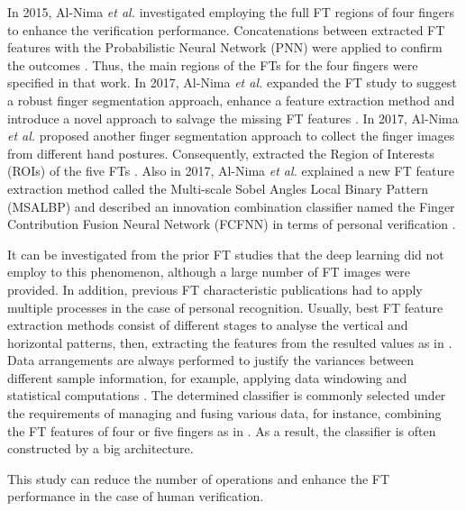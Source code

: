 \documentclass[conference]{IEEEtran}
\begin{document}
In 2015, Al-Nima \textit{et al.} investigated employing the full FT regions of four fingers to enhance the verification performance. Concatenations between extracted FT features with the Probabilistic Neural Network (PNN) were applied to confirm the outcomes \cite{Al-Nima2015Human}. Thus, the main regions of the FTs for the four fingers were specified in that work. In 2017, Al-Nima \textit{et al.} expanded the FT study to suggest a robust finger segmentation approach, enhance a feature extraction method and introduce a novel approach to salvage the missing FT features \cite{Al-Nima2017Robust}. In 2017, Al-Nima \textit{et al.} proposed another finger segmentation approach to collect the finger images from different hand postures. Consequently, extracted the Region of Interests (ROIs) of the five FTs \cite{Al-Nima2017efficient}. Also in 2017, Al-Nima \textit{et al.} explained a new FT feature extraction method called the Multi-scale Sobel Angles Local Binary Pattern (MSALBP) and described an innovation combination classifier named the Finger Contribution Fusion Neural Network (FCFNN) in terms of personal verification \cite{Al-Nima2017finger}. 

It can be investigated from the prior FT studies that the deep learning did not employ to this phenomenon, although a large number of FT images were provided. In addition, previous FT characteristic publications had to apply multiple processes in the case of personal recognition. Usually, best FT feature extraction methods consist of different stages to analyse the vertical and horizontal patterns, then, extracting the features from the resulted values as in \cite{Al-Nima2017Robust} \cite{Al-Nima2017finger} \cite{Al-Nima2017efficient}. Data arrangements are always performed to justify the variances between different sample information, for example, applying data windowing and statistical computations \cite{Al-Nima2015Human} \cite{Al-Nima2016ANovel}. The determined classifier is commonly selected under the requirements of managing and fusing various data, for instance, combining the FT features of four or five fingers as in \cite{Pavesic2009Finger-based} \cite{Kanhangad2011AUnified} \cite{Al-Nima2017Robust} \cite{Al-Nima2017finger}. As a result, the classifier is often constructed by a big architecture. 

This study can reduce the number of operations and enhance the FT performance in the case of human verification. 
\end{document}
